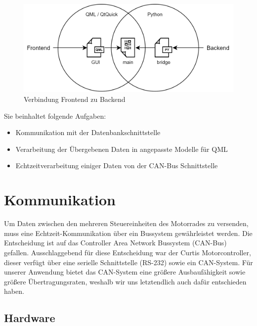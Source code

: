 \begin{figure}[H]
	\begin{center}
		\includegraphics[scale=0.33]{figures/hcis/bridge.png}
		\caption{Verbindung Frontend zu Backend}
	\end{center}
\end{figure}

Sie beinhaltet folgende Aufgaben:

\begin{itemize}
	\item Kommunikation mit der Datenbankschnittstelle
	\item Verarbeitung der Übergebenen Daten in angepasste Modelle für QML
	\item Echtzeitverarbeitung einiger Daten von der CAN-Bus Schnittstelle
\end{itemize}

\newpage


\section{Kommunikation}

Um Daten zwischen den mehreren Steuereinheiten des Motorrades zu versenden, muss eine Echtzeit-Kommunikation über ein Bussystem gewährleistet werden. Die Entscheidung ist auf das Controller Area Network Bussystem (CAN-Bus) gefallen. Ausschlaggebend für diese Entscheidung war der Curtis Motorcontroller, dieser verfügt über eine serielle Schnittstelle (RS-232) sowie ein CAN-System. Für unserer Anwendung bietet das CAN-System eine größere Ausbaufähigkeit sowie größere Übertragungsraten, weshalb wir uns letztendlich auch dafür entschieden haben.

\subsection{Hardware}


